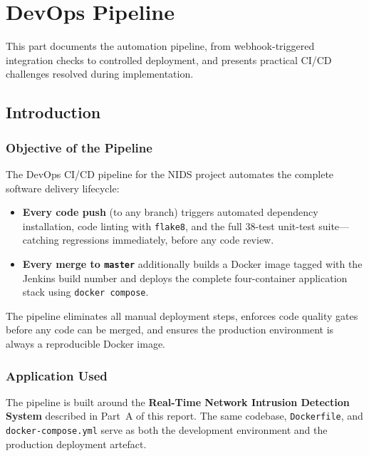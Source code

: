 \documentclass[12pt,a4paper]{report}
\begin{document}
\part{DevOps Pipeline}
This part documents the automation pipeline, from webhook-triggered
integration checks to controlled deployment, and presents practical CI/CD
challenges resolved during implementation.

\chapter{Introduction}

\section{Objective of the Pipeline}
The DevOps CI/CD pipeline for the NIDS project automates the complete software
delivery lifecycle:
\begin{itemize}
  \item \textbf{Every code push} (to any branch) triggers automated dependency
        installation, code linting with \texttt{flake8}, and the full
        38-test unit-test suite---catching regressions immediately, before
        any code review.
  \item \textbf{Every merge to \texttt{master}} additionally builds a Docker
        image tagged with the Jenkins build number and deploys the complete
        four-container application stack using \texttt{docker compose}.
\end{itemize}

The pipeline eliminates all manual deployment steps, enforces code quality
gates before any code can be merged, and ensures the production environment is
always a reproducible Docker image.

\section{Application Used}
The pipeline is built around the \textbf{Real-Time Network Intrusion Detection
System} described in Part~A of this report.  The same codebase,
\texttt{Dockerfile}, and \texttt{docker-compose.yml} serve as both the
development environment and the production deployment artefact.
\end{document}
